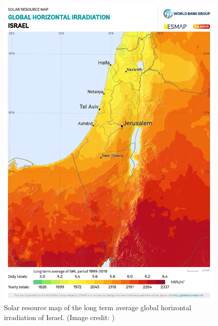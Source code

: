 \begin{figure}[h!]
	\centering
  	\includegraphics[width = \textwidth]{solar_maps/israel/israel_ghi}
  	\caption{Solar resource map of the long term average global horizontal irradiation of Israel. (Image credit: \cite{GlobalSolarAtlas:2020, Solargis:2021})}
	\label{fig:ghi_israel}
\end{figure}
